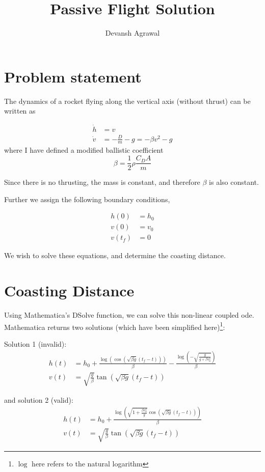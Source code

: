 \documentclass[12pt]{article}
\title{Passive Flight Solution}
\author{Devansh Agrawal}
\begin{document}
\maketitle


\section{Problem statement}

The dynamics of a rocket flying along the vertical axis (without thrust) can be written as

\begin{align}
\dot{h} &= v\\
\dot{v} &= -\frac{D}{m} - g = -\beta v^2  - g
\end{align}
where I have defined a modified ballistic coefficient
\begin{equation}
\beta = \frac{1}{2} \rho \frac{C_D A}{m}
\end{equation}

Since there is no thrusting, the mass is constant, and therefore $\beta$ is also constant. 

Further we assign the following boundary conditions, 

\begin{align}
h(0) &= h_0\\
v(0) &= v_0\\
v(t_f) &= 0
\end{align}

We wish to solve these equations, and determine the coasting distance. 


\section{Coasting Distance}

Using Mathematica's DSolve function, we can solve this non-linear coupled ode. Mathematica returns two solutions (which have been simplified here)\footnote{$\log$ here refers to the natural logarithm}:

Solution 1 (invalid):
\begin{align}
h(t) &=h_0 + \frac{\log \left(\cos \left(\sqrt{\beta  g}(t_f-t)\right)\right)}{\beta }-\frac{\log \left(-\sqrt{\frac{g}{g+\beta  v_0^2}}\right)}{\beta }\\
v(t) &=\sqrt{\frac{g}{\beta }} \tan \left(\sqrt{\beta  g}(t_f-t)\right)
\end{align}

and solution 2 (valid):
\begin{align}
h(t) &=h_0 + \frac{\log \left(\sqrt{1+\frac{\beta  v_0^2}{g}} \cos \left(\sqrt{\beta  g}(t_f-t)\right)\right)}{\beta } \label{eqn:h}\\
v(t) &= \sqrt{\frac{g}{\beta }} \tan \left(\sqrt{\beta  g}(t_f-t)\right) \label{eqn:v}
\end{align}
\end{document}
